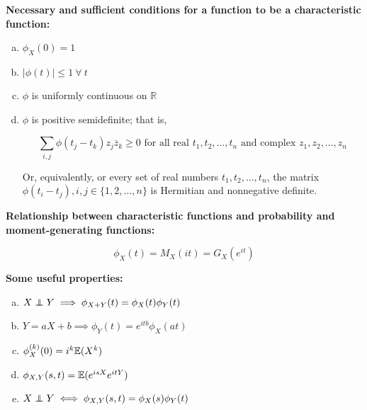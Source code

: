 \begin{proposition} \textbf{Necessary and sufficient conditions for a function to be a characteristic function:}

\begin{enumerate}[(a)]

\item \(\phi_X(0) = 1\)

\item \(\left| \phi(t)\right| \leq 1 \ \forall \ t\)

\item \(\phi\) is uniformly continuous on \(\mathbb{R}\)

\item \(\phi\) is positive semidefinite; that is,

\[
\sum_{i, j} \phi(t_j - t_k)z_j \overline{z}_k \geq 0 \text{ for all real } t_1, t_2, \ldots, t_n \text{ and complex } z_1, z_2, \ldots, z_n
\]

Or, equivalently, or every set of real numbers \(t_1, t_2, \ldots, t_n\), the matrix \(\phi(t_i - t_j), i, j \in \{1, 2, \ldots, n\}\) is Hermitian and nonnegative definite.

\end{enumerate}
\end{proposition}

\begin{remark} \textbf{Relationship between characteristic functions and probability and moment-generating functions:}

\[
\phi_X(t)  =M_X(it) = G_X(e^{it})
\]

\end{remark}

\begin{theorem}

\textbf{Some useful properties:}

\begin{enumerate}[(a)]

\item \(X \indep Y \implies \phi_{X + Y}(t) = \phi_X(t) \phi_Y(t)\)

\item \(Y = aX + b \implies \phi_Y(t) = e^{itb} \phi_X(at)\)

\item \(\phi_X^{(k)}(0) = i^k \mathbb{E}(X^k)\)

\item \(\phi_{X,Y}(s,t) = \mathbb{E}(e^{isX}e^{itY})\)

\item \(X \indep Y \iff \phi_{X,Y}(s,t) = \phi_X(s) \phi_Y(t)\)

\end{enumerate}

\end{theorem}

